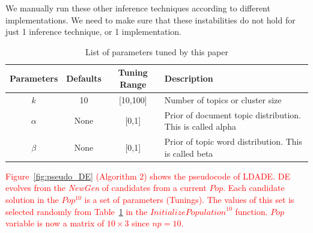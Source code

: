 \documentclass[twocolumn,5p,sort&compress]{elsarticle}
\newcommand{\fig}[1]{Figure~\ref{fig:#1}}
\theoremstyle{break}
\begin{document}
We manually run these other inference techniques according to different implementations. We need to make sure that these instabilities do not hold for just 1 inference technique, or 1 implementation.

\begin{table}[!htbp]
\begin{center}
\scriptsize
\caption{List of parameters tuned by this paper}
\label{tb:tuned}
\begin{tabular}{|c|c|c|p{3.5cm}|}
        \hline 
        \textbf{Parameters} & \textbf{Defaults} & \textbf{Tuning Range} & \textbf{Description}\\
        \hline
        $k$ & 10 & [10,100] & Number of topics or cluster size \\ 
        \hline
       $\alpha$ & None & [0,1] & Prior of document topic distribution. This is called alpha \\ 
        \hline
        $\beta$ & None & [0,1] & Prior of topic word distribution. This is called  beta \\

        \hline
\end{tabular}
\end{center}
\end{table}

\textcolor{red}{\fig{pseudo_DE} (Algorithm 2) shows the pseudocode of LDADE. DE evolves from the \textit{NewGen} of
candidates from a current $Pop$. Each candidate solution in the $Pop^{10}$ is a set of  parameters (Tunings). The values of this set is selected randomly from Table~\ref{tb:tuned} in the $\mathit{InitializePopulation}^{10}$ function. $Pop$ variable is now a matrix of $10\times3$ since $np=10$.}
\end{document}
